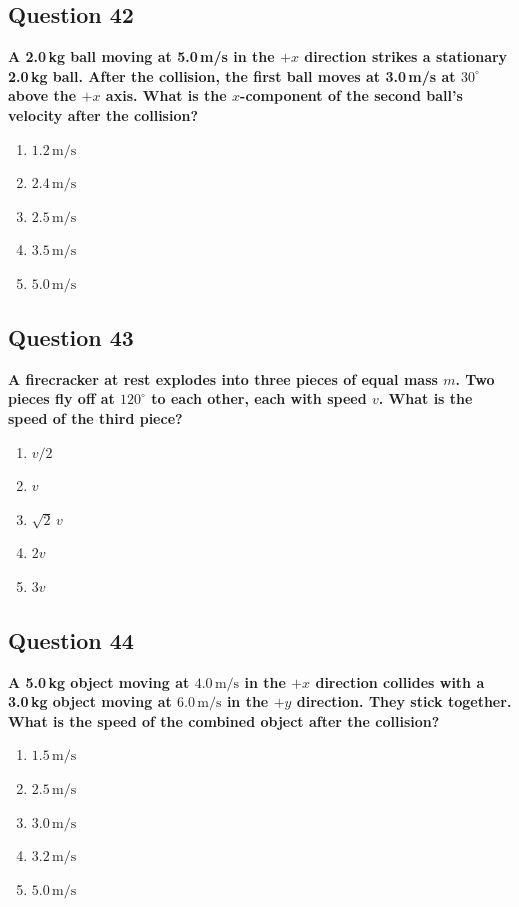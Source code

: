 \documentclass[12pt,letterpaper]{article}
\begin{document}
\subsection{Question 42}

\begin{questionbox}
\textbf{A 2.0\,kg ball moving at 5.0\,m/s in the $+x$ direction strikes a stationary 2.0\,kg ball. After the collision, the first ball moves at 3.0\,m/s at $30^\circ$ above the $+x$ axis. What is the $x$-component of the second ball's velocity after the collision?}

\begin{enumerate}[label=\alph*)]
    \item $1.2\,\text{m/s}$
    \item $2.4\,\text{m/s}$
    \item $2.5\,\text{m/s}$
    \item $3.5\,\text{m/s}$
    \item $5.0\,\text{m/s}$
\end{enumerate}
\end{questionbox}

\subsection{Question 43}

\begin{questionbox}
\textbf{A firecracker at rest explodes into three pieces of equal mass $m$. Two pieces fly off at $120^\circ$ to each other, each with speed $v$. What is the speed of the third piece?}

\begin{enumerate}[label=\alph*)]
    \item $v/2$
    \item $v$
    \item $\sqrt{2}\,v$
    \item $2v$
    \item $3v$
\end{enumerate}
\end{questionbox}

\subsection{Question 44}

\begin{questionbox}
\textbf{A 5.0\,kg object moving at $4.0\,\text{m/s}$ in the $+x$ direction collides with a 3.0\,kg object moving at $6.0\,\text{m/s}$ in the $+y$ direction. They stick together. What is the speed of the combined object after the collision?}

\begin{enumerate}[label=\alph*)]
    \item $1.5\,\text{m/s}$
    \item $2.5\,\text{m/s}$
    \item $3.0\,\text{m/s}$
    \item $3.2\,\text{m/s}$
    \item $5.0\,\text{m/s}$
\end{enumerate}
\end{questionbox}
\end{document}
